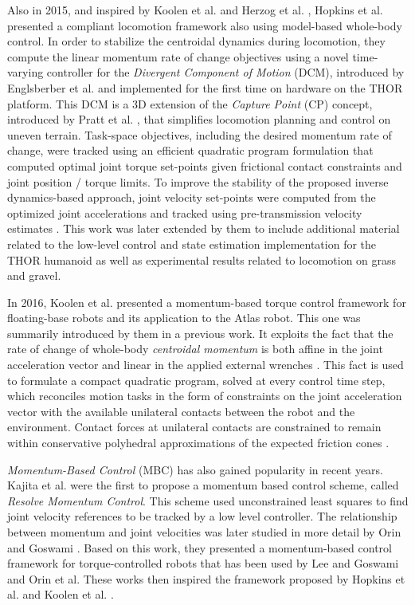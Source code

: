 	Also in 2015, and inspired by Koolen et al. \cite{Koolen_Humanoids2013} and Herzog et al.
	\cite{Herzog_IROS2014}, Hopkins et al. \cite{Hopkins_ICRA2015} presented a compliant locomotion
	framework also using model-based whole-body control.
	In order to stabilize the centroidal dynamics during locomotion, they compute the linear momentum
	rate of change objectives using a	novel time-varying controller for the
	\emph{Divergent Component of Motion} (DCM), introduced by	Englsberber et al. \cite{Englsberger_IROS2013}
	and implemented for the first time on hardware on the THOR platform.
	This DCM is a 3D extension of the \emph{Capture Point} (CP) concept, introduced by Pratt et al.
	\cite{Pratt_Humanoids2006}, that simplifies locomotion planning and control on uneven terrain.
	Task-space objectives, including the desired momentum rate of change, were tracked using an efficient
	quadratic program formulation that computed optimal joint torque set-points given frictional contact
	constraints and joint position / torque limits.
	To improve the stability of the proposed inverse dynamics-based approach, joint velocity set-points
	were computed from the optimized joint accelerations and tracked using pre-transmission velocity
	estimates	\cite{Hopkins_ICRA2015}.
	This work was later extended by them \cite{Hopkins_IJHR2016} to include additional material related
	to the low-level control and state estimation implementation for the THOR humanoid as well as
	experimental results related to locomotion on grass and gravel.
	
	In 2016, Koolen et al. \cite{Koolen_IJHR2016} presented a momentum-based torque control framework for
	floating-base robots and its application to the Atlas robot.
	This one was summarily introduced by them \cite{Koolen_Humanoids2013} in a previous work.
	It exploits the fact that the rate of change of whole-body \emph{centroidal momentum}
	is both affine in the joint acceleration vector and linear in the applied external wrenches
	\cite{Orin_IROS2008}.
	This fact is used to formulate a compact quadratic program, solved at every control time step, which
	reconciles motion tasks in the form of constraints on the joint acceleration vector with the available
	unilateral contacts between the robot and the environment.
	Contact forces at unilateral contacts are constrained to remain within conservative polyhedral
	approximations of the expected friction cones \cite{Koolen_IJHR2016}.
	
	\emph{Momentum-Based Control} (MBC) has also gained popularity in recent years.
	Kajita et al. \cite{Kajita_IROS2003} were the first to propose a momentum based control scheme,
	called \emph{Resolve Momentum Control}.
	This scheme used unconstrained least squares to find joint velocity references to be tracked by
	a low level controller.
	The relationship between momentum and joint velocities was later studied in more detail by
	Orin and Goswami \cite{Orin_IROS2008}.
	Based on this work, they presented a momentum-based control framework for torque-controlled robots
	that has been used by Lee and Goswami	\cite{LeeS_IROS2010} \cite{LeeS_AutoRobots2012} and
	Orin et al. \cite{Orin_AutoRobots2013}
	These works then inspired the framework proposed by Hopkins et al. \cite{Hopkins_IJHR2016} and
	Koolen et al. \cite{Koolen_IJHR2016}.
	
